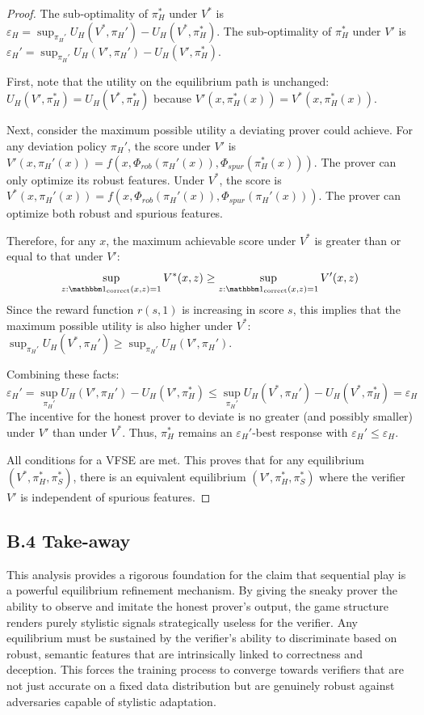 \begin{proof}
        The sub-optimality of $\pi_H^*$ under $V^*$ is $\varepsilon_H = \sup_{\pi_H'} U_H(V^*, \pi_H') - U_H(V^*, \pi_H^*)$.
        The sub-optimality of $\pi_H^*$ under $V'$ is $\varepsilon_H' = \sup_{\pi_H'} U_H(V', \pi_H') - U_H(V', \pi_H^*)$.

        First, note that the utility on the equilibrium path is unchanged: $U_H(V', \pi_H^*) = U_H(V^*, \pi_H^*)$ because $V'(x, \pi_H^*(x)) = V^*(x, \pi_H^*(x))$.

        Next, consider the maximum possible utility a deviating prover could achieve. For any deviation policy $\pi_H'$, the score under $V'$ is $V'(x, \pi_H'(x)) = f(x, \Phi_{rob}(\pi_H'(x)), \Phi_{spur}(\pi_H^*(x)))$. The prover can only optimize its robust features. Under $V^*$, the score is $V^*(x, \pi_H'(x)) = f(x, \Phi_{rob}(\pi_H'(x)), \Phi_{spur}(\pi_H'(x)))$. The prover can optimize both robust and spurious features.

        Therefore, for any $x$, the maximum achievable score under $V^*$ is greater than or equal to that under $V'$:
        \[
        \sup_{z: \corr(x,z)=1} V^*(x, z) \ge \sup_{z: \corr(x,z)=1} V'(x, z)
        \]
        Since the reward function $r(s,1)$ is increasing in score $s$, this implies that the maximum possible utility is also higher under $V^*$: $\sup_{\pi_H'} U_H(V^*, \pi_H') \ge \sup_{\pi_H'} U_H(V', \pi_H')$.

        Combining these facts:
        \[
        \varepsilon_H' = \sup_{\pi_H'} U_H(V', \pi_H') - U_H(V', \pi_H^*) \le \sup_{\pi_H'} U_H(V^*, \pi_H') - U_H(V^*, \pi_H^*) = \varepsilon_H
        \]
        The incentive for the honest prover to deviate is no greater (and possibly smaller) under $V'$ than under $V^*$. Thus, $\pi_H^*$ remains an $\varepsilon_H'$-best response with $\varepsilon_H' \le \varepsilon_H$.

    All conditions for a VFSE are met. This proves that for any equilibrium $(V^*, \pi_H^*, \pi_S^*)$, there is an equivalent equilibrium $(V', \pi_H^*, \pi_S^*)$ where the verifier $V'$ is independent of spurious features.
\end{proof}

\subsection*{B.4 Take-away}

This analysis provides a rigorous foundation for the claim that sequential play is a powerful equilibrium refinement mechanism. By giving the sneaky prover the ability to observe and imitate the honest prover's output, the game structure renders purely stylistic signals strategically useless for the verifier. Any equilibrium must be sustained by the verifier's ability to discriminate based on robust, semantic features that are intrinsically linked to correctness and deception. This forces the training process to converge towards verifiers that are not just accurate on a fixed data distribution but are genuinely robust against adversaries capable of stylistic adaptation.